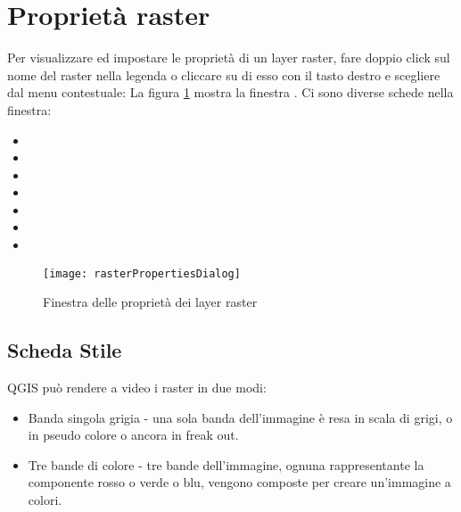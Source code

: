 \section{Proprietà raster}\label{label_rasterprop}

Per visualizzare ed impostare le proprietà di un layer raster, fare doppio
click sul nome del raster nella legenda o cliccare su di esso con il tasto
destro e scegliere  dal menu contestuale:
La figura \ref{fig:raster_properties} mostra la finestra . 
Ci sono diverse schede nella finestra: 

\begin{itemize}
 \item {}
 \item {}
 \item {}
 \item {}
 \item {}
 \item {}
 \item {}
\end{itemize}

\begin{figure}[h]
  \begin{center}
   \caption{Finestra delle proprietà dei layer raster \nixcaption}\label{fig:raster_properties}\smallskip
   \texttt{[image: rasterPropertiesDialog]}
\end{center}  
\end{figure}

\subsection{Scheda Stile}\label{label_sombology}

QGIS può rendere a video i raster in due modi:

\begin{itemize}[label=--]
\item Banda singola grigia - una sola banda dell'immagine è resa in scala di grigi,
o in pseudo colore o ancora in freak out.
\item Tre bande di colore - tre bande dell'immagine, ognuna rappresentante la componente rosso o verde o blu, 
vengono composte per creare un'immagine a colori.
\end{itemize}

